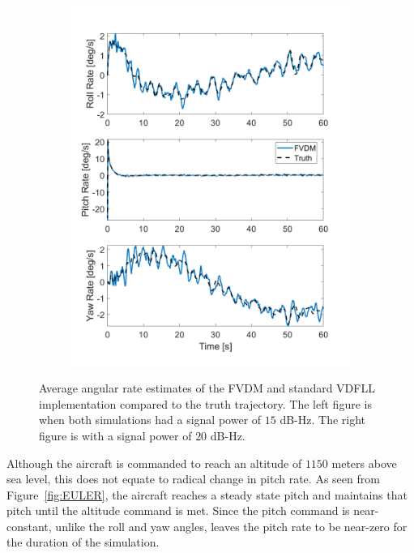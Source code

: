 \begin{figure}[!ht]
\begin{subfigure}{.45\textwidth}
        \includegraphics[width=1\linewidth]{Figures/dynamic/20/ANGULARRATES.png}
    \end{subfigure}
    \caption{Average angular rate estimates of the FVDM and standard VDFLL implementation compared to the truth trajectory. The left figure is when both simulations had a signal power of \(15\) dB-Hz. The right figure is with a signal power of \(20\) dB-Hz.}\label{fig:ANGRATES}
\end{figure}

Although the aircraft is commanded to reach an altitude of \(1150\) meters above sea level, this does not equate to radical change in pitch rate. As seen from Figure~\ref{fig:EULER}, the aircraft reaches a steady state pitch and maintains that pitch until the altitude command is met. Since the pitch command is near-constant, unlike the roll and yaw angles, leaves the pitch rate to be near-zero for the duration of the simulation.


